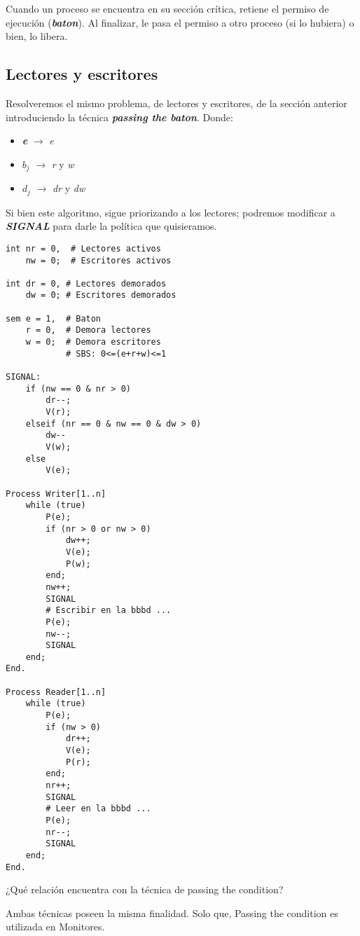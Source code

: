 \documentclass[a4paper, 10pt]{report}
\begin{document}
Cuando un proceso se encuentra en su sección crítica, retiene el permiso de ejecución (\textbf{\emph{baton}}). Al finalizar, le pasa el permiso a otro proceso (si lo hubiera) o bien, lo libera.

\subsection{Lectores y escritores}

Resolveremos el mismo problema, de lectores y escritores, de la sección anterior introduciendo la técnica \textbf{\emph{passing the baton}}. Donde:

\begin{itemize}
    \item \textbf{\emph{e}} $\rightarrow$ \emph{e}
    \item \textbf{\emph{$b_j$}} $\rightarrow$ \emph{r} y \emph{w}
    \item \textbf{\emph{$d_j$}} $\rightarrow$ \emph{dr} y \emph{dw}
\end{itemize}

Si bien este algoritmo, sigue priorizando a los lectores; podremos modificar a \textbf{\emph{SIGNAL}} para darle la política que quisieramos.

\begin{lstlisting}[multicols=2]
int nr = 0,  # Lectores activos
    nw = 0;  # Escritores activos

int dr = 0, # Lectores demorados
    dw = 0; # Escritores demorados

sem e = 1,  # Baton
    r = 0,  # Demora lectores
    w = 0;  # Demora escritores
            # SBS: 0<=(e+r+w)<=1

SIGNAL:
    if (nw == 0 & nr > 0)
        dr--;
        V(r);
    elseif (nr == 0 & nw == 0 & dw > 0)
        dw--
        V(w);
    else
        V(e);

Process Writer[1..n]
    while (true)
        P(e);
        if (nr > 0 or nw > 0)
            dw++;
            V(e);
            P(w);
        end;
        nw++;
        SIGNAL
        # Escribir en la bbbd ...
        P(e);
        nw--;
        SIGNAL
    end;
End.

Process Reader[1..n]
    while (true)
        P(e);
        if (nw > 0)
            dr++;
            V(e);
            P(r);
        end;
        nr++;
        SIGNAL
        # Leer en la bbbd ...
        P(e);
        nr--;
        SIGNAL
    end;
End.
\end{lstlisting}

\begin{basic_box}
     ¿Qué relación encuentra con la técnica de passing the condition?

    Ambas técnicas poseen la misma finalidad. Solo que, Passing the condition es utilizada en Monitores.
\end{basic_box}
\end{document}
